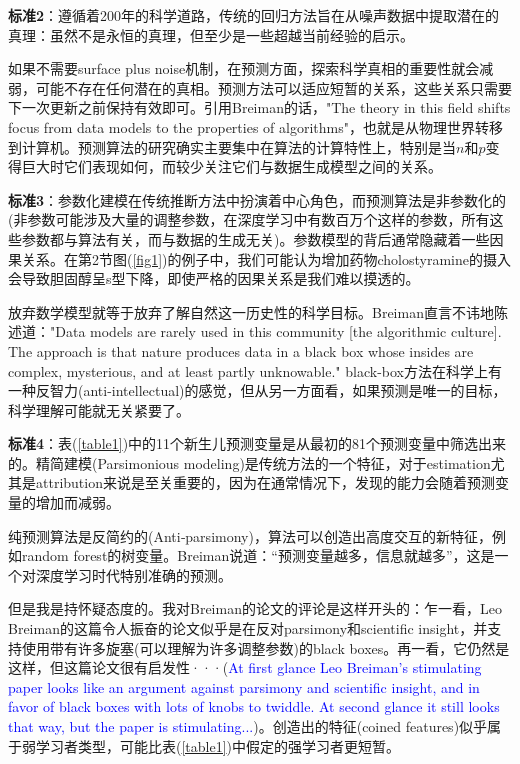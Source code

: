 \documentclass[lang=cn,11pt,a4paper,cite=authoryear]{elegantpaper}
\begin{document}
\textbf{标准2}：遵循着200年的科学道路，传统的回归方法旨在从噪声数据中提取潜在的真理：虽然不是永恒的真理，但至少是一些超越当前经验的启示。

如果不需要surface plus noise机制，在预测方面，探索科学真相的重要性就会减弱，可能不存在任何潜在的真相。预测方法可以适应短暂的关系，这些关系只需要下一次更新之前保持有效即可。引用Breiman的话，"The theory in this field shifts focus from data models to the properties of algorithms"，也就是从物理世界转移到计算机。预测算法的研究确实主要集中在算法的计算特性上，特别是当$n$和$p$变得巨大时它们表现如何，而较少关注它们与数据生成模型之间的关系。

\textbf{标准3}：参数化建模在传统推断方法中扮演着中心角色，而预测算法是非参数化的(非参数可能涉及大量的调整参数，在深度学习中有数百万个这样的参数，所有这些参数都与算法有关，而与数据的生成无关)。参数模型的背后通常隐藏着一些因果关系。在第2节图(\ref{fig1})的例子中，我们可能认为增加药物cholostyramine的摄入会导致胆固醇呈s型下降，即使严格的因果关系是我们难以摸透的。

放弃数学模型就等于放弃了解自然这一历史性的科学目标。Breiman直言不讳地陈述道："Data models are rarely used in this community [the algorithmic culture]. The approach is that nature produces data in a black box whose insides are complex, mysterious, and at least partly unknowable." black-box方法在科学上有一种反智力(anti-intellectual)的感觉，但从另一方面看，如果预测是唯一的目标，科学理解可能就无关紧要了。

\textbf{标准4}：表(\ref{table1})中的11个新生儿预测变量是从最初的81个预测变量中筛选出来的。精简建模(Parsimonious modeling)是传统方法的一个特征，对于estimation尤其是attribution来说是至关重要的，因为在通常情况下，发现的能力会随着预测变量的增加而减弱。

纯预测算法是反简约的(Anti‐parsimony)，算法可以创造出高度交互的新特征，例如random forest的树变量。Breiman说道：“预测变量越多，信息就越多”，这是一个对深度学习时代特别准确的预测。

但是我是持怀疑态度的。我对Breiman的论文的评论是这样开头的：乍一看，Leo Breiman的这篇令人振奋的论文似乎是在反对parsimony和scientific insight，并支持使用带有许多旋塞(可以理解为许多调整参数)的black boxes。再一看，它仍然是这样，但这篇论文很有启发性···(\textcolor{blue}{At first glance Leo Breiman's stimulating paper looks like an argument against parsimony and scientific insight, and in favor of black boxes with lots of knobs to twiddle. At second glance it still looks that way, but the paper is stimulating...})。创造出的特征(coined features)似乎属于弱学习者类型，可能比表(\ref{table1})中假定的强学习者更短暂。
\end{document}

